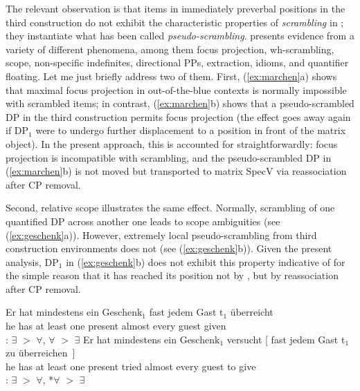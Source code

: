 \documentclass[output=paper]{langsci/langscibook}
\begin{document}
The relevant observation is that items in immediately preverbal positions in
the third construction do not exhibit the characteristic properties of {\it
scrambling} in ; they instantiate what has been called  {\it
pseudo-scrambling}.  \cite{Geilfuss:91} presents evidence  from a variety of
different phenomena, among them focus projection, wh-scrambling, scope,
non-specific indefinites, directional PPs, extraction, idioms, and quantifier
floating. Let me just briefly address two of them. First, (\ref{ex:marchen}a) shows that
maximal focus projection in out-of-the-blue contexts is normally impossible
with scrambled items; in contrast, (\ref{ex:marchen}b) shows that a pseudo-scrambled DP
in the third construction permits focus projection (the effect goes away again
if DP$_1$ were to undergo further displacement to a position in front of the
matrix object). In the present approach, this is accounted for
straightforwardly: focus projection is incompatible with scrambling, and the
pseudo-scrambled DP in (\ref{ex:marchen}b) is not moved but transported to
matrix SpecV via reassociation after CP removal.

\ea\label{ex:marchen} 
    \z
\z

Second, relative scope illustrates the same effect. Normally, scrambling of one
quantified DP across another one leads to scope ambiguities (see
(\ref{ex:geschenk}a)). However, extremely local pseudo-scrambling from third
construction environments does not (see (\ref{ex:geschenk}b)). Given the
present analysis, DP$_1$ in (\ref{ex:geschenk}b) does not exhibit this property
indicative of  for the simple reason that it has reached its position
not by , but by reassociation after CP removal.

\ea\label{ex:geschenk} 
    \ea
    \gll Er hat mindestens ein Geschenk$_1$ fast jedem Gast t$_1$ überreicht\\
        he\textsubscript{\Nom} has {at least} one present\textsubscript{\Acc} almost every guest\textsubscript{\Dat} {} given\\
    : $\exists$ $>$ $\forall$, $\forall$ $>$ $\exists$
    \ex
    \gll Er hat mindestens ein Geschenk$_1$ versucht [ fast jedem Gast t$_1$ zu überreichen~]\\
        he\textsubscript{\Nom} has {at least} one present\textsubscript{\Acc} tried {} almost every guest {} to give\\
    : $\exists$ $>$ $\forall$, *$\forall$ $>$ $\exists$
    \z
\z
\end{document}
